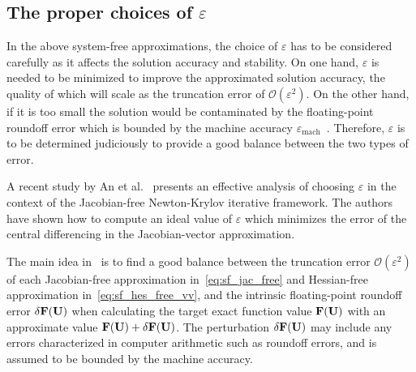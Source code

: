 \subsection{The proper choices of \( \varepsilon \)}

In the above system-free approximations, the choice of \( \varepsilon \) has to be considered carefully
as it affects the solution accuracy and stability.
On one hand, \( \varepsilon \) is needed to be minimized to improve
the approximated solution accuracy,
the quality of which will scale as the truncation error of \( \mathcal{O}(\varepsilon^{2}) \).
On the other hand, if it is too small the solution would be contaminated
by the floating-point roundoff error which is bounded by
the machine accuracy \( \varepsilon_{\text{mach}} \)~\cite{knoll2004jacobian}.
Therefore, $\varepsilon$ is to be determined judiciously
to provide a good balance between the two types of error.

A recent study by An et al.~\cite{an2011finite}
presents an effective analysis of choosing
\( \varepsilon \) in the context of the Jacobian-free Newton-Krylov iterative framework.
The authors have shown how to compute an ideal value of
\( \varepsilon \) which minimizes the error of the
central differencing in the Jacobian-vector approximation.

The main idea in~\cite{an2011finite} is to find a good
balance between the truncation error \( \mathcal{O}(\varepsilon^{2}) \)
of each Jacobian-free approximation in~\cref{eq:sf_jac_free}
and Hessian-free approximation in~\cref{eq:sf_hes_free_vv},
and the intrinsic floating-point roundoff error $\delta\mathbf{F}(\mathbf{U})$ when calculating
the target exact function value $\mathbf{F}(\mathbf{U})$ with
an approximate value $\mathbf{F}(\mathbf{U}) + \delta\mathbf{F}(\mathbf{U})$.
The perturbation $\delta\mathbf{F}(\mathbf{U})$ may include any errors characterized
in computer arithmetic such as roundoff errors, and is assumed to be
bounded by the machine accuracy.

